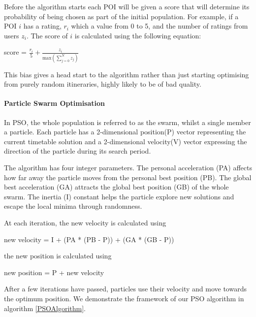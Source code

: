 Before the algorithm starts each POI will be given a score 
that will determine its probability of being chosen as
part of the initial population. For example, if a
POI $i$ has a rating, 
$r_i$ which a value from 0 to 5, and
the number of ratings from users $z_i$. The score of $i$
is calculated using the following equation:

    \begin{center}
        score = $\frac{r_i}{5}+\frac{z_i}{\text{max}(\sum_{j=0}^{N}{z_j})}$

    \end{center}

This bias gives a head start to the algorithm
rather than just starting optimising from purely
random itineraries, highly likely to be of bad
quality.



\paragraph{Particle Swarm Optimisation}

In PSO, the whole population is referred to as the
swarm, whilst a single member a particle. Each
particle has a 2-dimensional position(P) vector
representing the current timetable solution and a
2-dimensional velocity(V) vector expressing the direction
of the particle during its search period. 

The algorithm has four integer parameters. The
personal acceleration (PA) affects how far away the
particle moves from the personal best position (PB). 
The global best acceleration (GA) attracts the global
best position (GB) of the whole swarm. 
The inertia (I) constant helps the particle
explore new solutions and escape the local minima
through randomness. 

At each
iteration, the new velocity is calculated using
\begin{center}
    new velocity = I + (PA * (PB - P)) + (GA * (GB - P))
\end{center}

the new position is calculated using
\begin{center}
    new position = P + new velocity 
\end{center}

After a few iterations have passed, particles use
their velocity and move towards the optimum position.
We demonstrate the framework of our PSO algorithm in
algorithm \ref{PSOAlgorithm}.




